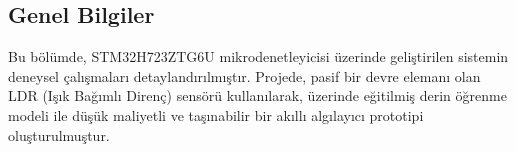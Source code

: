 \subsection{Genel Bilgiler}
Bu bölümde, STM32H723ZTG6U mikrodenetleyicisi üzerinde geliştirilen sistemin deneysel çalışmaları detaylandırılmıştır. Projede, pasif bir devre elemanı olan LDR (Işık Bağımlı Direnç) sensörü kullanılarak, üzerinde eğitilmiş derin öğrenme modeli ile düşük maliyetli ve taşınabilir bir akıllı algılayıcı prototipi oluşturulmuştur. 

